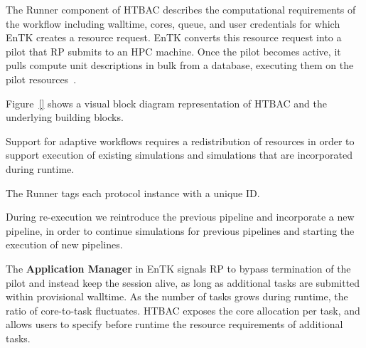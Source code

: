 The Runner component of HTBAC describes the computational requirements of the 
workflow including walltime, cores, queue, and user credentials 
 for which EnTK creates a resource request. 
EnTK converts this resource request into a pilot that RP submits to an HPC 
machine. Once the pilot becomes active, it pulls compute unit descriptions in 
bulk from a database, executing them on the pilot 
resources~\cite{merzky2015radical}. 

Figure~\ref{} shows a visual block diagram representation
 of HTBAC and the underlying building
blocks.

Support for adaptive workflows requires a redistribution of resources in order 
to support execution of existing simulations and simulations that are 
incorporated during runtime. 

The Runner tags each protocol instance with a unique ID. 

During re-execution we reintroduce
the previous pipeline and incorporate a new pipeline, in order to continue
simulations for previous pipelines and starting the execution of new pipelines. 


The \textbf{Application Manager} in EnTK signals RP to bypass termination of
the pilot and instead keep the session alive, as long as additional tasks are
submitted within provisional walltime. As the number of tasks grows during 
runtime, the ratio of core-to-task fluctuates. HTBAC exposes the core allocation 
per task, and allows users to specify before runtime the resource requirements 
of additional tasks.



